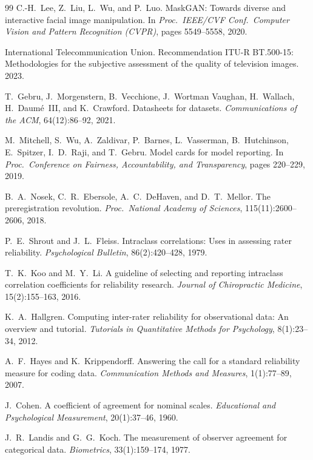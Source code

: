 \documentclass[10pt,twocolumn]{article}
\begin{document}
\begin{thebibliography}{99}
C.-H.~Lee, Z.~Liu, L.~Wu, and P.~Luo.
{MaskGAN}: Towards diverse and interactive facial image manipulation.
In \emph{Proc.\ IEEE/CVF Conf.\ Computer Vision and Pattern Recognition (CVPR)}, pages 5549--5558, 2020.

International Telecommunication Union.
Recommendation ITU-R BT.500-15: Methodologies for the subjective assessment of the quality of television images.
2023.

T.~Gebru, J.~Morgenstern, B.~Vecchione, J.~Wortman Vaughan, H.~Wallach, H.~Daum{\'e}~III, and K.~Crawford.
Datasheets for datasets.
\emph{Communications of the ACM}, 64(12):86--92, 2021.

M.~Mitchell, S.~Wu, A.~Zaldivar, P.~Barnes, L.~Vasserman, B.~Hutchinson, E.~Spitzer, I.~D.~Raji, and T.~Gebru.
Model cards for model reporting.
In \emph{Proc.\ Conference on Fairness, Accountability, and Transparency}, pages 220--229, 2019.

B.~A.~Nosek, C.~R.~Ebersole, A.~C.~DeHaven, and D.~T.~Mellor.
The preregistration revolution.
\emph{Proc.\ National Academy of Sciences}, 115(11):2600--2606, 2018.

P.~E.~Shrout and J.~L.~Fleiss.
Intraclass correlations: Uses in assessing rater reliability.
\emph{Psychological Bulletin}, 86(2):420--428, 1979.

T.~K.~Koo and M.~Y.~Li.
A guideline of selecting and reporting intraclass correlation coefficients for reliability research.
\emph{Journal of Chiropractic Medicine}, 15(2):155--163, 2016.

K.~A.~Hallgren.
Computing inter-rater reliability for observational data: An overview and tutorial.
\emph{Tutorials in Quantitative Methods for Psychology}, 8(1):23--34, 2012.

A.~F.~Hayes and K.~Krippendorff.
Answering the call for a standard reliability measure for coding data.
\emph{Communication Methods and Measures}, 1(1):77--89, 2007.

J.~Cohen.
A coefficient of agreement for nominal scales.
\emph{Educational and Psychological Measurement}, 20(1):37--46, 1960.

J.~R.~Landis and G.~G.~Koch.
The measurement of observer agreement for categorical data.
\emph{Biometrics}, 33(1):159--174, 1977.

\end{thebibliography}
\end{document}
